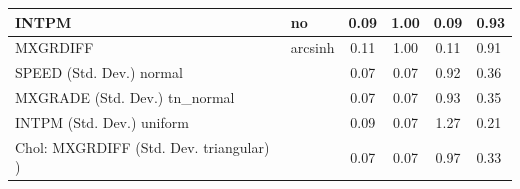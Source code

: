 \begin{table}
\begin{center}
\begin{tabular}{|l|l|c|c|c|l|}
			\hline
			INTPM & no & 0.09 & 1.00 & 0.09 & 0.93 \\
			\hline
			MXGRDIFF & arcsinh & 0.11 & 1.00 & 0.11 & 0.91 \\
			\hline
			SPEED (Std. Dev.) normal &  & 0.07 & 0.07 & 0.92 & 0.36 \\
			\hline
			MXGRADE (Std. Dev.) tn_normal &  & 0.07 & 0.07 & 0.93 & 0.35 \\
			\hline
			INTPM (Std. Dev.) uniform &  & 0.09 & 0.07 & 1.27 & 0.21 \\
			\hline
			 Chol: MXGRDIFF (Std. Dev. triangular) ) &  & 0.07 & 0.07 & 0.97 & 0.33 \\
			\hline
		\end{tabular}
	\end{center}
\end{table}